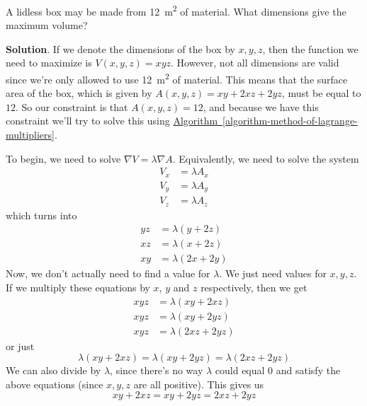 \documentclass[10pt,]{book}
\theoremstyle{ptxplainnotitle}
\theoremstyle{ptxplaintitle}
\theoremstyle{ptxplainnotitle}
\theoremstyle{ptxplaintitle}
\theoremstyle{ptxplainnotitle}
\theoremstyle{ptxplaintitle}
\theoremstyle{ptxdefinitionnotitle}
\theoremstyle{ptxdefinitiontitle}
\theoremstyle{ptxdefinitionnotitle}
\theoremstyle{ptxdefinitiontitle}
\theoremstyle{ptxdefinitionnotitle}
\theoremstyle{ptxdefinitiontitle}
\theoremstyle{ptxdefinitionnotitle}
\theoremstyle{ptxdefinitiontitle}
\theoremstyle{ptxdefinitionnotitle}
\theoremstyle{ptxdefinitiontitle}
\numberwithin{equation}{section}
\newcommand{\grad}{\nabla}
\begin{document}
\begin{example}\label{example-maximizing-volume}
\hypertarget{p-1099}{}%
A lidless box may be made from \SI{12}{\meter\tothe{2}} of material. What dimensions give the maximum volume?%
\par\smallskip%
\noindent\textbf{Solution}.\hypertarget{solution-173}{}\quad%
\hypertarget{p-1100}{}%
If we denote the dimensions of the box by \(x,y,z\), then the function we need to maximize is \(V(x,y,z) = xyz\). However, not all dimensions are valid since we're only allowed to use \SI{12}{\meter\tothe{2}} of material. This means that the surface area of the box, which is given by \(A(x,y,z) = xy + 2xz + 2yz\), must be equal to \(12\). So our constraint is that \(A(x,y,z) = 12\), and because we have this constraint we'll try to solve this using \hyperref[algorithm-method-of-lagrange-multipliers]{Algorithm~\ref{algorithm-method-of-lagrange-multipliers}}.%
\par
\hypertarget{p-1101}{}%
To begin, we need to solve \(\grad V = \lambda \grad A\). Equivalently, we need to solve the system%
\begin{align*}
V_{x} & = \lambda A_{x} \\
V_{y} & = \lambda A_{y} \\
V_{z} & = \lambda A_{z} 
\end{align*}
which turns into%
\begin{align*}
yz & = \lambda(y + 2z) \\
xz & = \lambda(x + 2z) \\
xy & = \lambda(2x + 2y) 
\end{align*}
Now, we don't actually need to find a value for \(\lambda\). We just need values for \(x,y,z\). If we multiply these equations by \(x\), \(y\) and \(z\) respectively, then we get%
\begin{align*}
xyz & = \lambda(xy + 2xz) \\
xyz & = \lambda(xy + 2yz) \\
xyz & = \lambda(2xz + 2yz) 
\end{align*}
or just%
\begin{equation*}
\lambda(xy + 2xz) = \lambda(xy + 2yz) = \lambda(2xz + 2yz)
\end{equation*}
We can also divide by \(\lambda\), since there's no way \(\lambda\) could equal \(0\) and satisfy the above equations (since \(x,y,z\) are all positive). This gives us%
\begin{equation}
xy + 2xz = xy + 2yz = 2xz + 2yz\label{equation-lagrange-example-1}

\end{equation}
\end{example}
\end{document}
